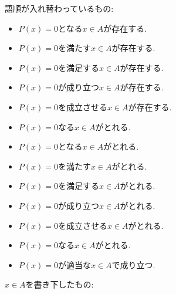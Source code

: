 \documentclass[a4paper,12pt,draft]{amsart}
\newcommand{\PPP}[1]{P(#1)=0}
\begin{document}
語順が入れ替わっているもの:
\begin{itemize}
\item $\PPP{x}$となる$x\in A$が存在する.
\item $\PPP{x}$を満たす$x\in A$が存在する.
\item $\PPP{x}$を満足する$x\in A$が存在する.
\item $\PPP{x}$が成り立つ$x\in A$が存在する.
\item $\PPP{x}$を成立させる$x\in A$が存在する.
\item $\PPP{x}$なる$x\in A$がとれる.
\item $\PPP{x}$となる$x\in A$がとれる.
\item $\PPP{x}$を満たす$x\in A$がとれる.
\item $\PPP{x}$を満足する$x\in A$がとれる.
\item $\PPP{x}$が成り立つ$x\in A$がとれる.
\item $\PPP{x}$を成立させる$x\in A$がとれる.
\item $\PPP{x}$なる$x\in A$がとれる.
\item $\PPP{x}$が適当な$x\in A$で成り立つ.
\end{itemize}
$x\in A$を書き下したもの:
\end{document}
